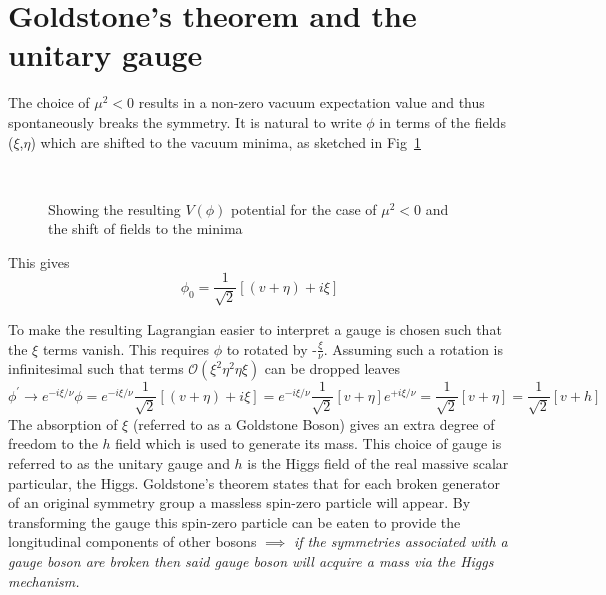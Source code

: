 \section{Goldstone's theorem and the unitary gauge}
The choice of $\mu^{2} < 0$ results in a non-zero vacuum expectation value and thus spontaneously breaks the symmetry. %
It is natural to write $\phi$ in terms of the fields ($\xi$,$\eta$) which are shifted to the vacuum minima, as sketched in Fig~\ref{fig:higgs}
\begin{figure}[ht!]
  \centering
  \\
           \caption{Showing \protect{} the resulting $V(\phi)$ potential for the case of $\mu^{2}<0$ and \protect{} the shift of fields to the minima}
           \label{fig:higgs}
\end{figure}



This gives
\begin{equation}
  \phi_{0} = \frac{1}{\sqrt{2}}[(v+\eta) + i\xi]
  \end{equation}


To make the resulting Lagrangian easier to interpret a gauge is chosen such that the $\xi$ terms vanish.  This  requires $\phi$ to rotated by -$\frac{\xi}{\nu}$. Assuming such a rotation is infinitesimal such that terms $\mathcal{O}(\xi^{2}\eta^{2}\eta\xi)$ can be dropped leaves
\begin{equation}
  \phi^{'} \to e^{-i\xi/\nu}\phi  = e^{-i\xi/\nu}\frac{1}{\sqrt{2}}[(v+\eta) + i\xi] = e^{-i\xi/\nu}\frac{1}{\sqrt{2}}[v+\eta]e^{+i\xi/\nu} = \frac{1}{\sqrt{2}}[v+\eta] =\frac{1}{\sqrt{2}}[v+h]
\end{equation}
The absorption of $\xi$ (referred to as a Goldstone Boson) gives an extra degree of freedom to the $h$ field which is used to generate its mass. This choice of gauge is referred to as the unitary gauge and $h$ is the Higgs field of the real massive scalar particular, the Higgs. Goldstone's theorem states that for each broken generator of an original symmetry group a massless spin-zero particle will appear. By transforming the gauge this spin-zero particle can be eaten to provide the longitudinal components of other bosons $\implies$ \emph{if the symmetries associated with a gauge boson are broken then said gauge boson will acquire a mass via the Higgs mechanism.}
